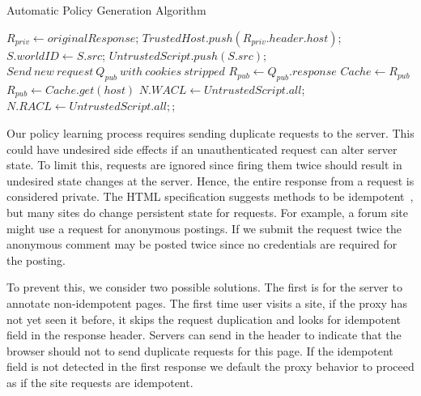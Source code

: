 \begin{algorithm}
\caption{Automatic Policy Generation Algorithm}\label{alg:esorics_policy_generation}
\begin{algorithmic}
	\State $R_{priv}\gets originalResponse$;
  \State $TrustedHost.push(R_{priv}.header.host)$;
			\State $S.worldID \gets S.src$;
			\State $UntrustedScript.push(S.src)$;
		\EndIf
	\EndFor
			\State $Send\ new\ request\ Q_{pub}\ with\ cookies\ stripped$
			\State $R_{pub} \gets Q_{pub}.response$
			\State $Cache \gets R_{pub}$
		\Else
			\State $R_{pub} \gets Cache.get(host)$
		\EndIf
					\State $N.WACL \gets UntrustedScript.all$;
				\EndIf
					\State $N.RACL \gets UntrustedScript.all;$;
				\EndIf
			\EndFor
		\EndFor
  \EndIf
\EndWhile
\end{algorithmic}
\end{algorithm}

  Our policy learning process requires sending duplicate requests to the server.  This could have undesired side effects if an unauthenticated request can alter server state.  To limit this,  requests are ignored since firing them twice should result in undesired state changes at the server.  Hence, the entire response from a  request is considered private.  The HTML specification suggests  methods to be idempotent~\cite{Idempotent}, but many sites do change persistent state for  requests.  For example, a forum site might use a  request for anonymous postings.  If we submit the request twice the anonymous comment may be posted twice since no credentials are required for the posting.  

To prevent this, we consider two possible solutions.  The first is for the server to annotate non-idempotent pages.  The first time user visits a site, if the proxy has not yet seen it before, it skips the request duplication and looks for idempotent field in the response header.  Servers can send  in the header to indicate that the browser should not to send duplicate requests for this page.  If the idempotent field is not detected in the first response we default the proxy behavior to proceed as if the site requests are idempotent.  

